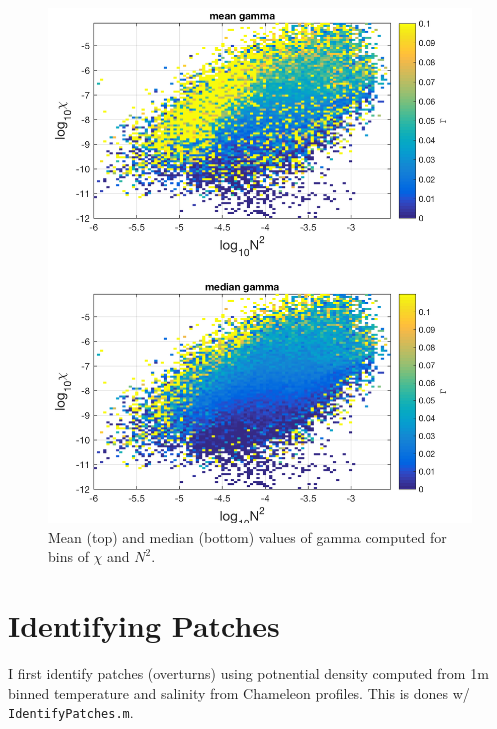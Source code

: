 \documentclass[11pt]{article}
\begin{document}
\begin{figure}[htbp]
\includegraphics[scale=0.8]{Gamma_binnedBy_N2_chi.png}
\caption{Mean (top) and median (bottom) values of gamma computed for bins of $\chi$ and $N^2$.}
\label{gambychin2}
\end{figure}


\clearpage
\section{Identifying Patches}

I first identify patches (overturns) using potnential density computed from 1m binned temperature and salinity from Chameleon profiles. This is dones w/ \verb+IdentifyPatches.m+.
\end{document}
